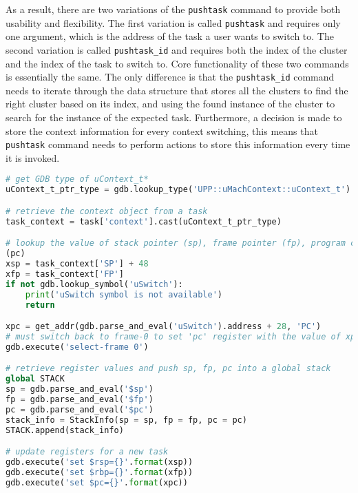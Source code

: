 As a result, there are two variations of the \verb|pushtask| command to provide both usability and flexibility. The first variation is called \verb|pushtask| and requires
only one argument, which is the address of the task a user wants to switch to.
The second variation is called \verb|pushtask_id| and requires both the index of
the cluster and the index of the task to switch to. Core functionality of these two commands is
essentially the same. The only difference is that the \verb|pushtask_id| command
needs to iterate through the data structure that stores all the clusters to find
the right cluster based on its index, and using the found instance of the
cluster to search for the instance of the expected task. Furthermore, a decision
is made to store the context information for every context switching, this means
that \verb|pushtask| command needs to perform actions to store this information every time it is
invoked.
\begin{lstlisting}[language=Python, caption={Abridged \text{push\_task} Code},
label={pushtask-code}]
# get GDB type of uContext_t*
uContext_t_ptr_type = gdb.lookup_type('UPP::uMachContext::uContext_t').pointer

# retrieve the context object from a task
task_context = task['context'].cast(uContext_t_ptr_type)

# lookup the value of stack pointer (sp), frame pointer (fp), program counter
(pc)
xsp = task_context['SP'] + 48
xfp = task_context['FP']
if not gdb.lookup_symbol('uSwitch'):
    print('uSwitch symbol is not available')
    return

xpc = get_addr(gdb.parse_and_eval('uSwitch').address + 28, 'PC')
# must switch back to frame-0 to set 'pc' register with the value of xpc
gdb.execute('select-frame 0')

# retrieve register values and push sp, fp, pc into a global stack
global STACK
sp = gdb.parse_and_eval('$sp')
fp = gdb.parse_and_eval('$fp')
pc = gdb.parse_and_eval('$pc')
stack_info = StackInfo(sp = sp, fp = fp, pc = pc)
STACK.append(stack_info)

# update registers for a new task
gdb.execute('set $rsp={}'.format(xsp))
gdb.execute('set $rbp={}'.format(xfp))
gdb.execute('set $pc={}'.format(xpc))
\end{lstlisting}


